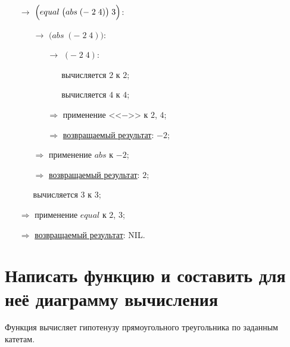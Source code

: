 \begin{itemize}
	\item[$\longrightarrow$] $\Bigl(equal\; \bigl(abs\; (-\; 2\; 4)\bigr)\; 3\Bigr)$:
	\begin{itemize}
		\item[$\longrightarrow$] $\bigl(abs\; (-\; 2\; 4)\bigr)$:
		\begin{itemize}
			\item[$\longrightarrow$] $(-\; 2\; 4)$:
			\begin{itemize}
				\item[\textbullet] вычисляется $2$ к $2$;
				\item[\textbullet] вычисляется $4$ к $4$;
			\end{itemize}
			\item[$\Longrightarrow$] применение <<$-$>> к $2$, $4$;
			\item[$\Longrightarrow$] \underline{возвращаемый результат}: $-2$;
		\end{itemize}
		\item[$\Longrightarrow$] применение $abs$ к $-2$;
		\item[$\Longrightarrow$] \underline{возвращаемый результат}: $2$;
		\item[\textbullet] вычисляется $3$ к $3$;
	\end{itemize}
	\item[$\Longrightarrow$] применение $equal$ к $2$, $3$;
	\item[$\Longrightarrow$] \underline{возвращаемый результат}: NIL.
\end{itemize}



\newpage
\section{Написать функцию и составить для неё диаграмму вычисления}

\problem Функция вычисляет гипотенузу прямоугольного треугольника по заданным катетам.\\[0.1cm]


